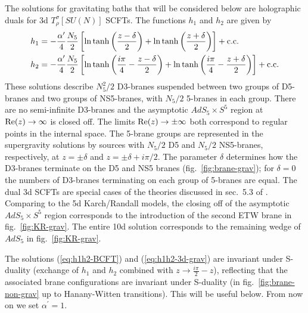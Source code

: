 \documentclass[aps,prd,11pt,notitlepage,longbibliography,nofootinbib,tightenlines,preprintnumbers]{revtex4-1}
\def\Re{\mathop{\rm Re}}
\begin{document}
The solutions for gravitating baths that will be considered below are holographic duals for 3d $T_\rho^\sigma[SU(N)]$ SCFTs.
The functions $h_1$ and $h_2$ are given by
\begin{align}\label{eq:h1h2-3d-grav}
	h_1&=-\frac{\alpha^\prime}{4}\frac{N_5}{2}\left[\ln\tanh\left(\frac{z-\delta}{2}\right)+
\ln	\tanh\left(\frac{z+\delta}{2}\right)\right]+\rm{c.c.}
	\nonumber\\
	h_2&=-\frac{\alpha^\prime}{4}\frac{N_5}{2}\left[\ln\tanh\left(\frac{i\pi}{4}-\frac{z-\delta}{2}\right)
	+\ln\tanh\left(\frac{i\pi}{4}-\frac{z+\delta}{2}\right)\right]+\rm{c.c.}
\end{align}
These solutions describe $N_5^2/2$ D3-branes suspended between two groups of D5-branes and two groups of NS5-branes, with $N_5/2$ 5-branes in each group.
There are no semi-infinite D3-branes and the asymptotic $AdS_5\times S^5$ region at $\Re(z)\rightarrow \infty$ is closed off.
The limits $\Re(z)\rightarrow \pm\infty$ both correspond to regular points in the internal space.
%
The 5-brane groups are represented in the supergravity solutions by sources with $N_5/2$ D5 and $N_5/2$ NS5-branes, respectively, at $z=\pm\delta$ and $z=\pm\delta+i\pi/2$. The parameter $ \delta$ determines how the D3-branes terminate on the D5 and NS5 branes (fig.~\ref{fig:brane-grav}); for $\delta=0$ the numbers of D3-branes terminating on each group of 5-branes are equal.
The dual 3d SCFTs are special cases of the theories discussed in sec.~5.3 of \cite{Coccia:2020wtk}.
%
Comparing to the 5d Karch/Randall models, the closing off of the asymptotic $AdS_5\times S^5$ region corresponds to the introduction of the second ETW brane in fig.~\ref{fig:KR-grav}. The entire 10d solution corresponds to the remaining wedge of $AdS_5$ in fig.~\ref{fig:KR-grav}.

The solutions (\ref{eq:h1h2-BCFT}) and (\ref{eq:h1h2-3d-grav}) are invariant under S-duality (exchange of $h_1$ and $h_2$ combined with $z\rightarrow \frac{i\pi}{2}-z$),
reflecting that the associated brane configurations are invariant under S-duality (in fig.~\ref{fig:brane-non-grav} up to Hanany-Witten transitions).
This will be useful below. 
From now on we set $\alpha^\prime=1$.
\end{document}
